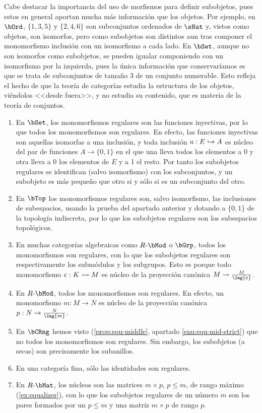Cabe destacar la importancia del uso de morfismos para definir subobjetos, pues
estos en general aportan mucha más información que los objetos. Por ejemplo, en
$\bOrd$, $\{1,3,5\}$ y $\{2,4,6\}$ son subconjuntos ordenados de $\sNat$ y,
vistos como objetos, son isomorfos, pero como subobjetos son distintos aun tras
componer el monomorfismo inclusión con un isomorfismo a cada lado. En $\bSet$,
aunque no son isomorfos como subobjetos, se pueden igualar componiendo con un
isomorfismo por la izquierda, pues la única información que conservaríamos es
que se trata de subconjuntos de tamaño 3 de un conjunto numerable. Esto refleja
el hecho de que la teoría de categorías estudia la estructura de los objetos,
viéndolos <<desde fuera>>, y no estudia su contenido, que es materia de la
teoría de conjuntos.

\begin{example}\;
  \label{ex:reg-mono}
  \begin{enumerate}
  \item \label{enu:reg-mono-set} En $\bSet$, los monomorfismos regulares son las
    funciones inyectivas, por lo que todos los monomorfismos son regulares. En
    efecto, las funciones inyectivas son aquellas isomorfas a una inclusión, y
    toda inclusión $u:E\hookrightarrow A$ es núcleo del par de funciones $A\to\{0,1\}$ en
    el que una lleva todos los elementos a 0 y otra lleva a 0 los elementos de
    $E$ y a 1 el resto. Por tanto los subobjetos regulares se identifican (salvo
    isomorfismo) con los subconjuntos, y un subobjeto es más pequeño que otro si
    y sólo si es un subconjunto del otro.
  \item En $\bTop$ los monomorfismos regulares son, salvo isomorfismo, las
    inclusiones de subespacios, usando la prueba del apartado anterior y dotando
    a $\{0,1\}$ de la topología indiscreta, por lo que los subobjetos regulares
    son los subespacios topológicos.
  \item En muchas categorías algebraicas como $R\dash\bMod$ o $\bGrp$, todos los
    monomorfismos son regulares, con lo que los subobjetos regulares son
    respectivamente los submódulos y los subgrupos. Esto es porque todo
    monomorfismo $e:K\rightarrowtail M$ es núcleo de la proyección canónica
    $M\mapsto\frac{M}{\Img{e}}$.
  \item En $R\dash\bMod$, todos los monomorfismos son regulares. En efecto, un
    monomorfismo $m:M\to N$ es núcleo de la proyección canónica
    $p:N\to\frac{N}{\Img{m}}$.
  \item En $\bCRng$ hemos visto (\ref{prop:equ-middle}, apartado
    \ref{enu:equ-mid-strict}) que no todos los monomorfismos son regulares. Sin
    embargo, los subobjetos (a secas) son precisamente los subanillos.
  \item En una categoría fina, sólo las identidades son regulares.
  \item En $R\dash\bMat$, los núcleos son las matrices $m\times p$, $p\leq m$,
    de rango máximo (\ref{ex:equalizer}), con lo que los subobjetos regulares de
    un número $m$ son los pares formados por un $p\leq m$ y una matriz
    $m\times p$ de rango $p$.
  \end{enumerate}
\end{example}

